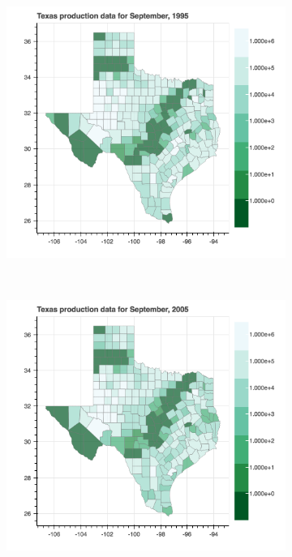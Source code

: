 \documentclass[11pt,letterpaper]{article}
\begin{document}
\begin{figure}
\begin{subfigure}{0.3\textwidth}
\includegraphics[width=1.2\linewidth]{tx_prod_1995}
\end{subfigure}
~
\begin{subfigure}{0.3\textwidth}
\includegraphics[width=1.2\linewidth]{tx_prod_2005}
\end{subfigure}
~
\begin{subfigure}{0.3\textwidth}

\end{subfigure}
\end{figure}
\end{document}
